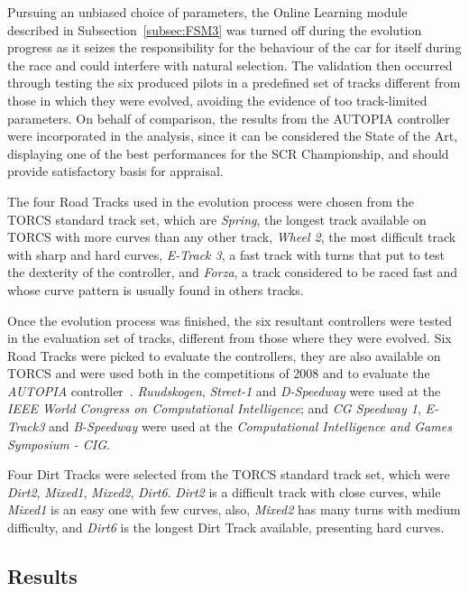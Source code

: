 	Pursuing an unbiased choice of parameters, the Online Learning module described in Subsection~\ref{subsec:FSM3} was turned off during the evolution progress as it seizes the responsibility for the behaviour of the car for itself during the race and could interfere with natural selection. The validation then occurred through testing the six produced pilots in a predefined set of tracks different from those in which they were evolved, avoiding the evidence of too track-limited parameters. On behalf of comparison, the results from the AUTOPIA controller were incorporated in the analysis, since it can be considered the State of the Art, displaying one of the best performances for the SCR Championship, and should provide satisfactory basis for appraisal.

	The four Road Tracks used in the evolution process were chosen from the TORCS standard track set, which are \emph{Spring}, the longest track available on TORCS with more curves than any other track, \emph{Wheel 2}, the most difficult track with sharp and hard curves, \emph{E-Track 3}, a fast track with turns that put to test the dexterity of the controller, and \emph{Forza}, a track considered to be raced fast and whose curve pattern is usually found in others tracks.
	
	Once the evolution process was finished, the six resultant controllers were tested in the evaluation set of tracks, different from those where they were evolved. Six Road Tracks were picked to evaluate the controllers, they are also available on TORCS and were used both in the competitions of 2008 and to evaluate the \emph{AUTOPIA} controller~\cite{AUTOPIA2009}. \emph{Ruudskogen}, \emph{Street-1} and \emph{D-Speedway} were used at the \emph{IEEE World Congress on Computational Intelligence}; and \emph{CG Speedway 1}, \emph{E-Track3} and \emph{B-Speedway} were used at the \emph{Computational Intelligence and Games Symposium - CIG}.

	Four Dirt Tracks were selected from the TORCS standard track set, which were \emph{Dirt2}, \emph{Mixed1}, \emph{Mixed2}, \emph{Dirt6}. \emph{Dirt2} is a difficult track with close curves, while \emph{Mixed1} is an easy one with few curves, also, \emph{Mixed2} has many turns with medium difficulty, and \emph{Dirt6} is the longest Dirt Track available, presenting hard curves.
	  
	
\subsection{Results} \label{subsec:Results}
	
